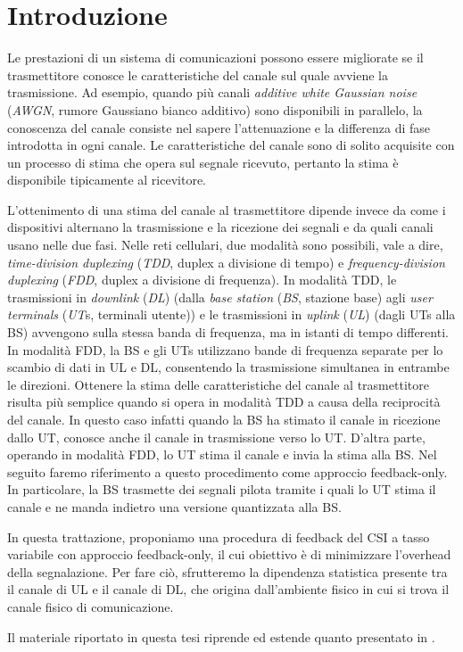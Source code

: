 \chapter{Introduzione}

\thispagestyle{empty}

\vspace{9.1pt}  %

Le prestazioni di un sistema di comunicazioni possono essere migliorate se il
trasmettitore conosce le caratteristiche del canale sul quale avviene la
trasmissione. Ad esempio, quando più canali \textit{additive white Gaussian
noise} (\textit{AWGN}, rumore Gaussiano bianco additivo) sono disponibili in
parallelo, la conoscenza del canale consiste nel sapere l'attenuazione e la
differenza di fase introdotta in ogni canale. Le caratteristiche del canale
sono di solito acquisite con un processo di stima che opera sul segnale
ricevuto, pertanto la stima è disponibile tipicamente al ricevitore.

L'ottenimento di una stima del canale al trasmettitore dipende invece da come i
dispositivi alternano la trasmissione e la ricezione dei segnali e da quali
canali usano nelle due fasi. Nelle reti cellulari, due modalità sono possibili,
vale a dire, \textit{time-division duplexing} (\textit{TDD}, duplex a divisione
di tempo) e \textit{frequency-division duplexing} (\textit{FDD}, duplex a
divisione di frequenza). In modalità TDD, le trasmissioni in \textit{downlink}
(\textit{DL}) (dalla \textit{base station} (\textit{BS}, stazione base) agli
\textit{user terminals} (\textit{UT}s, terminali utente)) e le trasmissioni in
\textit{uplink} (\textit{UL}) (dagli UTs alla BS) avvengono sulla stessa banda
di frequenza, ma in istanti di tempo differenti. In modalità FDD, la BS e gli
UTs utilizzano bande di frequenza separate per lo scambio di dati in UL e DL,
consentendo la trasmissione simultanea in entrambe le direzioni. Ottenere la
stima delle caratteristiche del canale al trasmettitore risulta più semplice
quando si opera in modalità TDD a causa della reciprocità del canale. In questo
caso infatti quando la BS ha stimato il canale in ricezione dallo UT, conosce
anche il canale in trasmissione verso lo UT. D'altra parte, operando in
modalità FDD, lo UT stima il canale e invia la stima alla BS. Nel seguito
faremo riferimento a questo procedimento come approccio feedback-only. In
particolare, la BS trasmette dei segnali pilota tramite i quali lo UT stima il
canale e ne manda indietro una versione quantizzata alla BS.

In questa trattazione, proponiamo una procedura di feedback del CSI a tasso
variabile con approccio feedback-only, il cui obiettivo è di minimizzare
l'overhead della segnalazione. Per fare ciò, sfrutteremo la dipendenza
statistica presente tra il canale di UL e il canale di DL, che origina
dall'ambiente fisico in cui si trova il canale fisico di comunicazione.

Il materiale riportato in questa tesi riprende ed estende quanto presentato in
\cite{https://doi.org/10.1002/ett.3628}.


